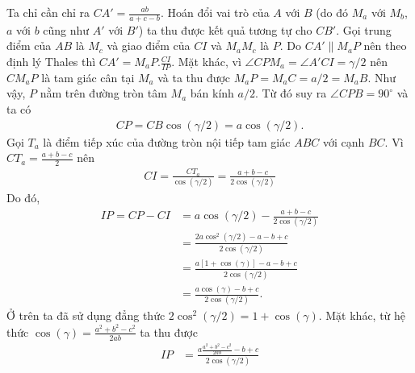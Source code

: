 \begin{multicols}{2}
\begin{figure}[H]
{}
			\vspace*{-10pt}
		\end{figure}
		Ta chỉ cần chỉ ra $CA' = \frac{ab}{a+c-b}$. Hoán đổi vai trò của $A$ với $B$ (do đó $M_a$ với $M_b$, $a$ với $b$ cũng như $A'$ với $B'$) ta thu được kết quả tương tự cho $CB'$. 
		\vskip 0.1cm
		Gọi trung điểm của $AB$ là $M_c$ và giao điểm của $CI$ và $M_aM_c$ là $P$. Do $CA' \parallel M_aP$ nên theo định lý Thales thì $CA' = M_aP. \frac{CI}{IP}$. Mặt khác, vì $\angle CPM_a = \angle A'CI = \gamma/2$ nên $CM_aP$ là tam giác cân tại $M_a$ và ta thu được $M_aP = M_aC = a/2 = M_aB$. Như vậy, $P$ nằm trên đường tròn tâm $M_a$ bán kính $a/2$. Từ đó suy ra $\angle CPB = 90^{\circ}$ và ta có 
		\begin{align*}
			CP = CB \cos (\gamma /2) = a \cos(\gamma/2).
		\end{align*}
		Gọi $T_a$ là điểm tiếp xúc của đường tròn nội tiếp tam giác $ABC$ với cạnh $BC$. Vì $CT_a = \frac{a+b-c}{2}$ nên 
		\begin{align*}
			CI = \frac{CT_a}{\cos(\gamma/2)} = \frac{a+b-c}{2 \cos(\gamma/2)}
		\end{align*} 
		Do đó,
		\begin{align*}
			IP = CP -CI & = a \cos(\gamma/2) - \frac{a+b-c}{2 \cos(\gamma/2)} \\
			& = \frac{2a \cos^2(\gamma/2) - a-b+c}{2 \cos (\gamma/2)} \\
			& = \frac{a[1+\cos (\gamma)] - a -b +c}{2 \cos (\gamma/2)} \\
			& = \frac{a\cos(\gamma) - b +c}{2 \cos (\gamma/2)}.
		\end{align*}
		Ở trên ta đã sử dụng đẳng thức $2 \cos^2(\gamma/2) = 1 + \cos (\gamma)$. Mặt khác, từ hệ thức $\cos(\gamma) = \frac{a^2 + b^2 - c^2}{2ab}$ ta thu được
		\begin{align*}
			IP & = \frac{a \frac{a^2 + b^2 - c^2}{2ab} -b+c}{2 \cos (\gamma/2)} \\

\end{align*}
\end{multicols}

